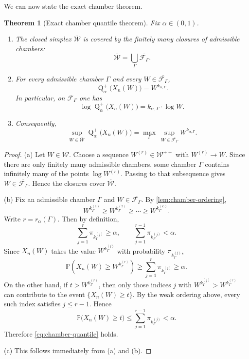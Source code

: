 \documentclass[11pt]{article}
\newtheorem{theorem}{Theorem}[section]
\theoremstyle{definition}
\newcommand{\Prob}{\mathbb{P}}
\newcommand{\1}{\mathbf{1}}
\newcommand{\Quant}{\operatorname{Q}}
\begin{document}
We can now state the exact chamber theorem.

\begin{theorem}[Exact chamber quantile theorem]\label{thm:chamber-quantile}
Fix $\alpha\in(0,1)$.
\begin{enumerate}[label=(\alph*), itemsep=4pt]
  \item The closed simplex $\overline{\mathcal W}$ is covered by the finitely many closures of admissible chambers:
  \[
  \overline{\mathcal W}=\bigcup_{\Gamma}\overline{\mathcal F_\Gamma}.
  \]
  \item For every admissible chamber $\Gamma$ and every $W\in\overline{\mathcal F_\Gamma}$,
  \begin{equation}\label{eq:chamber-quantile}
  \Quant_\alpha^+\bigl(X_n(W)\bigr)=W^{k_{\alpha,\Gamma}}.
  \end{equation}
  In particular, on $\mathcal F_\Gamma$ one has
  \[
  \log \Quant_\alpha^+\bigl(X_n(W)\bigr)=k_{\alpha,\Gamma}\cdot \log W.
  \]
  \item Consequently,
  \begin{equation}\label{eq:finite-decomp}
  \sup_{W\in\overline{\mathcal W}} \Quant_\alpha^+\bigl(X_n(W)\bigr)
  =
  \max_{\Gamma}\ \sup_{W\in\overline{\mathcal F_\Gamma}} W^{k_{\alpha,\Gamma}}.
  \end{equation}
\end{enumerate}
\end{theorem}

\begin{proof}
(a) Let $W\in\overline{\mathcal W}$. Choose a sequence $W^{(r)}\in\mathcal W^{++}$ with $W^{(r)}\to W$. Since there are only finitely many admissible chambers, some chamber $\Gamma$ contains infinitely many of the points $\log W^{(r)}$. Passing to that subsequence gives $W\in\overline{\mathcal F_\Gamma}$. Hence the closures cover $\overline{\mathcal W}$.

(b) Fix an admissible chamber $\Gamma$ and $W\in\overline{\mathcal F_\Gamma}$. By \cref{lem:chamber-ordering},
\[
W^{k^{(1)}_\Gamma}\ge W^{k^{(2)}_\Gamma}\ge\cdots\ge W^{k^{(L)}_\Gamma}.
\]
Write $r=r_\alpha(\Gamma)$. Then by definition,
\[
\sum_{j=1}^{r}\pi_{k^{(j)}_\Gamma}\ge \alpha,
\qquad
\sum_{j=1}^{r-1}\pi_{k^{(j)}_\Gamma}<\alpha.
\]
Since $X_n(W)$ takes the value $W^{k^{(j)}_\Gamma}$ with probability $\pi_{k^{(j)}_\Gamma}$,
\[
\Prob\!\left(X_n(W)\ge W^{k^{(r)}_\Gamma}\right)
\ge
\sum_{j=1}^{r}\pi_{k^{(j)}_\Gamma}
\ge \alpha.
\]
On the other hand, if $t>W^{k^{(r)}_\Gamma}$, then only those indices $j$ with $W^{k^{(j)}_\Gamma}>W^{k^{(r)}_\Gamma}$ can contribute to the event $\{X_n(W)\ge t\}$. By the weak ordering above, every such index satisfies $j\le r-1$. Hence
\[
\Prob\bigl(X_n(W)\ge t\bigr)
\le
\sum_{j=1}^{r-1}\pi_{k^{(j)}_\Gamma}
<\alpha.
\]
Therefore \eqref{eq:chamber-quantile} holds.

(c) This follows immediately from (a) and (b).
\end{proof}
\end{document}
